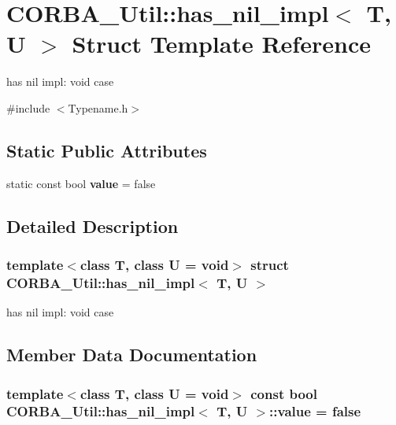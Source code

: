 \section{CORBA\_\-Util::has\_\-nil\_\-impl$<$ T, U $>$ Struct Template Reference}
\label{structCORBA__Util_1_1has__nil__impl}


has nil impl: void case  




{\ttfamily \#include $<$Typename.h$>$}

\subsection*{Static Public Attributes}
\begin{DoxyCompactItemize}
\item 
static const bool {\bf value} = false
\end{DoxyCompactItemize}


\subsection{Detailed Description}
\subsubsection*{template$<$class T, class U = void$>$ struct CORBA\_\-Util::has\_\-nil\_\-impl$<$ T, U $>$}

has nil impl: void case 

\subsection{Member Data Documentation}
\subsubsection[{value}]{\setlength{\rightskip}{0pt plus 5cm}template$<$class T, class U = void$>$ const bool {\bf CORBA\_\-Util::has\_\-nil\_\-impl}$<$ T, U $>$::{\bf value} = false\hspace{0.3cm}{\ttfamily  [static]}}\label{structCORBA__Util_1_1has__nil__impl_aa27da7b5dbbe553ba9cef2c86adcf68b}
